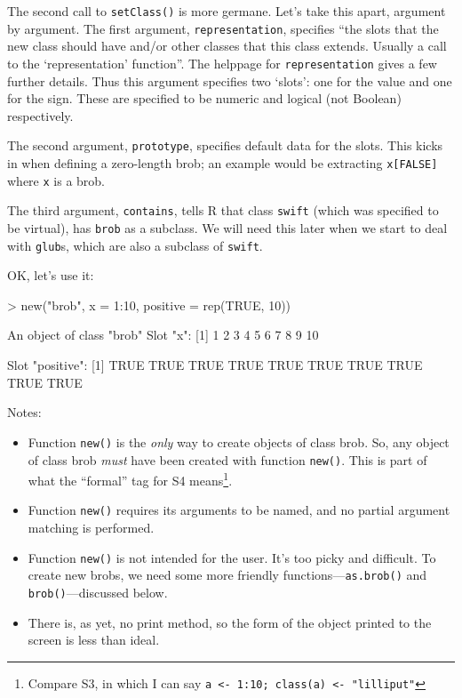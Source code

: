 \documentclass[a4paper]{article}
\begin{document}
The second call to {\tt setClass()} is more germane.  Let's take this
apart, argument by argument.  The first argument,
{\tt representation}, specifies ``the slots that the new class
should have and/or other classes that this class extends.  Usually a
call to the `representation' function''.  The helppage for
{\tt representation} gives a few further details.  Thus this argument
specifies two `slots': one for the value and one for the sign.  These
are specified to be numeric and logical (not Boolean) respectively.

The second argument, {\tt prototype}, specifies default data for the
slots.  This kicks in when defining a zero-length brob; an example
would be extracting {\tt x[FALSE]} where {\tt x} is a brob.

The third argument, {\tt contains}, tells R that class {\tt swift}
(which was specified to be virtual), has {\tt brob} as a subclass.
We will need this later when we start to deal with {\tt glub}s, which
are also a subclass of {\tt swift}.

OK, let's use it:

\begin{Schunk}
\begin{Sinput}
> new("brob", x = 1:10, positive = rep(TRUE, 10))
\end{Sinput}
\begin{Soutput}
An object of class "brob"
Slot "x":
 [1]  1  2  3  4  5  6  7  8  9 10

Slot "positive":
 [1] TRUE TRUE TRUE TRUE TRUE TRUE TRUE TRUE TRUE TRUE
\end{Soutput}
\end{Schunk}

Notes:
\begin{itemize}
\item Function {\tt new()} is the {\em only} way to create objects
  of class brob.  So, any object of class brob {\em must} have been
  created with function {\tt new()}.  This is part of what the
  ``formal'' tag for S4 means\footnote{Compare S3, in which I can say
  {\tt a <- 1:10; class(a) <- "lilliput"}}.
\item Function {\tt new()} requires its arguments to be named, and no
  partial argument matching is performed.
\item Function {\tt new()} is not intended for the user.   It's too
  picky and difficult.  To create new brobs, we need some more
  friendly functions---{\tt as.brob()} and {\tt brob()}---discussed
  below.
\item There is, as yet, no print method, so the form of the object
  printed to the screen is less than ideal.
\end{itemize}
\end{document}
